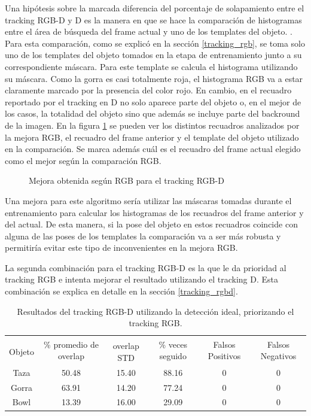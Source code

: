 Una hipótesis sobre la marcada diferencia del porcentaje de solapamiento entre el tracking RGB-D y D es la manera en que se hace la comparación de histogramas entre el área de búsqueda del frame actual y uno de los templates del objeto. . Para esta comparación, como se explicó en la sección \ref{tracking_rgb}, se toma solo uno de los templates del objeto tomados en la etapa de entrenamiento junto a su correspondiente máscara. Para este template se calcula el histograma utilizando su máscara. Como la gorra es casi totalmente roja, el histograma RGB va a estar claramente marcado por la presencia del color rojo. En cambio, en el recuadro reportado por el tracking en D no solo aparece parte del objeto o, en el mejor de los casos, la totalidad del objeto sino que además se incluye parte del backround de la imagen. En la figura \ref{mejora_rgb_en_tracking_rgbd} se pueden ver los distintos recuadros analizados por la mejora RGB, el recuadro del frame anterior y el template del objeto utilizado en la comparación. Se marca además cuál es el recuadro del frame actual elegido como el mejor según la comparación RGB.

\begin{figure}
	\caption{Mejora obtenida según RGB para el tracking RGB-D}
	\label{mejora_rgb_en_tracking_rgbd}
\end{figure}

Una mejora para este algoritmo sería utilizar las máscaras tomadas durante el entrenamiento para calcular los histogramas de los recuadros del frame anterior y del actual. De esta manera, si la pose del objeto en estos recuadros coincide con alguna de las poses de los templates la comparación va a ser más robusta y permitiría evitar este tipo de inconvenientes en la mejora RGB.


La segunda combinación para el tracking RGB-D es la que le da prioridad al tracking RGB e intenta mejorar el resultado utilizando el tracking D. Esta combinación se explica en detalle en la sección \ref{tracking_rgbd}.

\begin{table}
    \begin{tabular}{|c|c|c|c|c|c|}
    \hline
    & \multirow{2}{2.4cm}{\% promedio de overlap} & & \multirow{2}{2cm}{\% veces seguido} & \multirow{2}{1.6cm}{Falsos Positivos} & \multirow{2}{1.6cm}{Falsos Negativos}\\
	Objeto & & overlap STD & & &\\
    \hline
    Taza   & 50.48      & 15.40       & 88.16             & 0                & 0\\
    \hline
    Gorra  & 63.91      & 14.20       & 77.24             & 0                & 0\\
    \hline
    Bowl   & 13.39      & 16.00       & 29.09             & 0                & 0\\
    \hline
    \end{tabular}
\caption{Resultados del tracking RGB-D utilizando la detección ideal, priorizando el tracking RGB.}
\label{tabla_rgbd_rgb}
\end{table}


